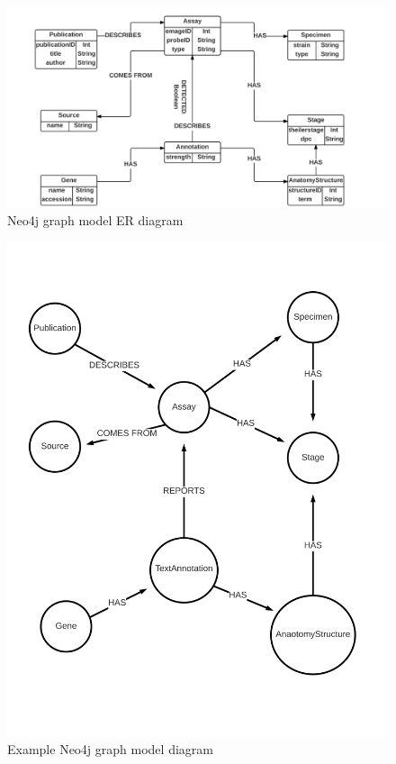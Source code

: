 \begin{figure}[H]\begin{center}\includegraphics[width=1\linewidth]{images/neo4j_model_er}\caption{Neo4j graph model ER diagram}\label{fig:neo1}\end{center}\end{figure}

\begin{figure}[H]\begin{center}\includegraphics[width=1\linewidth]{images/neo4j_model3}\caption{Example Neo4j graph model diagram}\label{fig:neo2}\end{center}\end{figure}
\newpage
